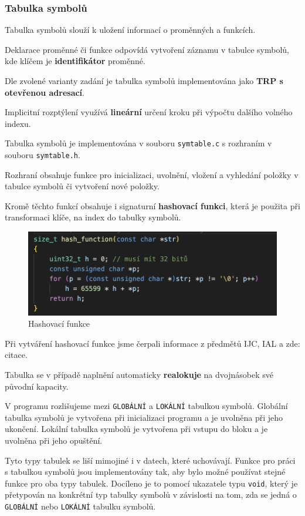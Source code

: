 \documentclass[a4paper, 11pt]{article}
\begin{document}
	\subsubsection{Tabulka symbolů}
	Tabulka symbolů slouží k uložení informací o proměnných a funkcích.
	\par\noindent Deklarace proměnné či funkce odpovídá vytvoření záznamu v tabulce symbolů, kde klíčem je \textbf{identifikátor} proměnné.
	\par\noindent Dle zvolené varianty zadání je tabulka symbolů implementována jako \textbf{TRP s otevřenou adresací}.
	\par\noindent Implicitní rozptýlení využívá \textbf{lineární} určení kroku při výpočtu dalšího volného indexu. 
	\par\noindent Tabulka symbolů je implementována v souboru \texttt{symtable.c} s rozhraním v souboru \texttt{symtable.h}.
	\par\noindent Rozhraní obsahuje funkce pro inicializaci, uvolnění, vložení a vyhledání položky v tabulce symbolů či vytvoření nové položky.
	\par\noindent Kromě těchto funkcí obsahuje i signaturní \textbf{hashovací funkci}, která je použita při transformaci klíče, na index do tabulky symbolů.
	\begin{figure}[h]
		\centering
		\includegraphics[width=0.5\linewidth]{include/hash_function.png}
		\caption{Hashovací funkce}
		\label{fig:hash_function}
	\end{figure}

	\par\noindent Při vytváření hashovací funkce jsme čerpali informace z předmětů IJC, IAL a zde: citace.


	\par\noindent Tabulka se v případě naplnění automaticky \textbf{realokuje} na dvojnásobek své původní kapacity.
	\par\noindent V programu rozlišujeme mezi \texttt{GLOBÁLNÍ} a \texttt{LOKÁLNÍ} tabulkou symbolů. Globální tabulka symbolů je vytvořena při inicializaci programu a je uvolněna při jeho ukončení. Lokální tabulka symbolů je vytvořena při vstupu do bloku a je uvolněna při jeho opuštění.
	\par\noindent Tyto typy tabulek se liší mimojiné i v datech, které uchovávají. Funkce pro práci s tabulkou symbolů jsou implementovány tak, aby bylo možné používat stejné funkce pro oba typy tabulek. Docíleno je to pomocí ukazatele typu \texttt{void}, který je přetypován na konkrétní typ tabulky symbolů v závislosti na tom, zda se jedná o \texttt{GLOBÁLNÍ} nebo \texttt{LOKÁLNÍ} tabulku symbolů.
	
\end{document}
